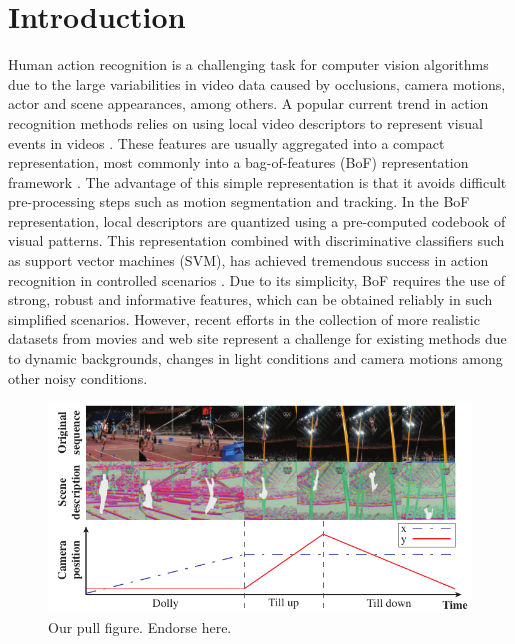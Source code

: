 \section{Introduction}
\label{introduction}

Human action recognition is a challenging task for computer vision algorithms due to the large variabilities in video data caused by occlusions,
camera motions, actor and scene appearances, among others. A popular current trend in action recognition methods relies on using local video
descriptors to represent visual events in videos \cite{Dollar2005, Laptev2005, WangCVPR2011}. These features are usually aggregated into
a compact representation, most commonly into a bag-of-features (BoF) representation framework \cite{Schuldt2004}. The advantage of this
simple representation is that it avoids difficult pre-processing steps such as motion segmentation and tracking.
In the BoF representation, local descriptors are quantized using a pre-computed codebook of visual patterns. This representation combined
with discriminative classifiers such as support vector machines (SVM), has achieved tremendous success in action recognition in controlled
scenarios \cite{Blank2005,Schuldt2004}. Due to its simplicity, BoF requires the use of strong, robust and informative features, which can be 
obtained reliably in such simplified scenarios. However, recent efforts in the collection of more realistic datasets from movies and web site 
\cite{Kuehne2011,Marszalek2009,Rodriguez2008} represent a challenge for existing methods due to dynamic backgrounds, changes in light 
conditions and camera motions among other noisy conditions. 

\begin{figure}[ht]
\begin{center}
\includegraphics[width=0.98\linewidth]{fig/PullFigure.pdf}
\end{center}
\caption{Our pull figure. Endorse here.}
\label{fig:pull_figure}
\end{figure}

